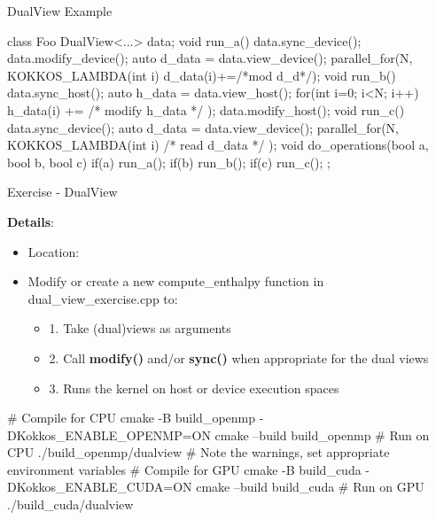 \begin{frame}[fragile]{DualView Example}

\begin{code}[keywords={sync_device,modify_device,view_device,view_host,sync_host,modify_host,DualView}]
class Foo {
DualView<...> data;
void run_a() {
  data.sync_device(); data.modify_device();
  auto d_data = data.view_device();
  parallel_for(N, KOKKOS_LAMBDA(int i) { d_data(i)+=/*mod d_d*/});
}
void run_b() {
  data.sync_host(); 
  auto h_data = data.view_host();
  for(int i=0; i<N; i++) { h_data(i) += /* modify h_data */ });
  data.modify_host();
}
void run_c() {
  data.sync_device();
  auto d_data = data.view_device();
  parallel_for(N, KOKKOS_LAMBDA(int i) { /* read d_data */ });
}
void do_operations(bool a, bool b, bool c) {
  if(a) run_a();
  if(b) run_b();
  if(c) run_c();
}
};
\end{code}
\end{frame}

\begin{frame}[fragile]{Exercise - DualView}

  \textbf{Details}:
  \begin{small}
  \begin{itemize}
    \item Location: 
    \item Modify or create a new compute\_enthalpy function in dual\_view\_exercise.cpp to:
    \begin{itemize}
      \item 1. Take (dual)views as arguments
      \item 2. Call \textbf{modify()} and/or \textbf{sync()} when appropriate for the dual views
      \item 3. Runs the kernel on host or device execution spaces
    \end{itemize}
  \end{itemize}
  \end{small}

\begin{code}
  # Compile for CPU
  cmake -B build_openmp -DKokkos_ENABLE_OPENMP=ON
  cmake --build build_openmp
  # Run on CPU
  ./build_openmp/dualview
  # Note the warnings, set appropriate environment variables
  # Compile for GPU
  cmake -B build_cuda -DKokkos_ENABLE_CUDA=ON
  cmake --build build_cuda
  # Run on GPU
  ./build_cuda/dualview
\end{code}

\end{frame}

